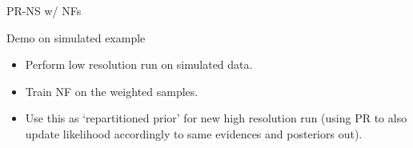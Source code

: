\documentclass[aspectratio=169, 11pt]{beamer}
\begin{document}
\begin{frame}{PR-NS w/ NFs}
    \centering
    \vfill
    \vfill
\end{frame}

\begin{frame}{Demo on simulated example}
\begin{minipage}{0.45\textwidth}\vspace{1em}
\begin{itemize}
    \item<1-> Perform low resolution run on simulated data.
    \item<2-> Train NF on the weighted samples.
    \item<3-> Use this as `repartitioned prior' for new high resolution run (using PR to also update likelihood accordingly to same evidences and posteriors out).
\end{itemize}
\end{minipage}
\begin{minipage}{0.45\textwidth}
\end{minipage}
\end{frame}
\end{document}
